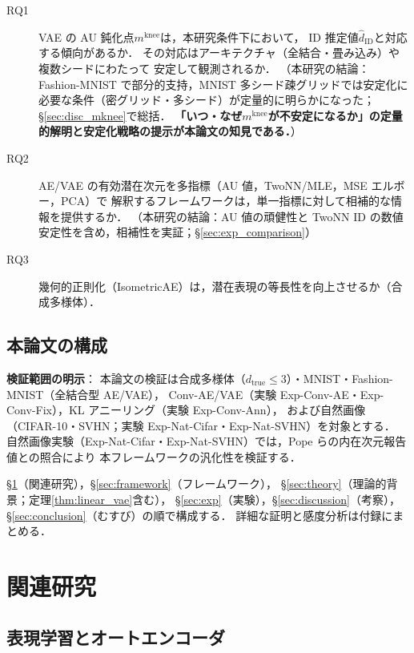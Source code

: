 \documentclass[11pt,a4paper]{jsarticle}
\newcommand{\mknee}{m^{\mathrm{knee}}}
\begin{document}
\begin{description}
  \item[RQ1] VAE の AU 鈍化点$\mknee$は，本研究条件下において，
             ID 推定値$\hat{d}_\mathrm{ID}$と対応する傾向があるか．
             その対応はアーキテクチャ（全結合・畳み込み）や複数シードにわたって
             安定して観測されるか．
             （本研究の結論：Fashion-MNIST で部分的支持，MNIST 多シード疎グリッドでは安定化に必要な条件（密グリッド・多シード）が定量的に明らかになった；
             §\ref{sec:disc_mknee}で総括．
             \textbf{「いつ・なぜ$\mknee$が不安定になるか」の定量的解明と安定化戦略の提示が本論文の知見である．}）
  \item[RQ2] AE/VAE の有効潜在次元を多指標（AU 値，TwoNN/MLE，MSE エルボー，PCA）で
             解釈するフレームワークは，単一指標に対して相補的な情報を提供するか．
             （本研究の結論：AU 値の頑健性と TwoNN ID の数値安定性を含め，相補性を実証；§\ref{sec:exp_comparison}）
  \item[RQ3] 幾何的正則化（IsometricAE）は，潜在表現の等長性を向上させるか（合成多様体）．
\end{description}

\subsection{本論文の構成}\label{sec:intro_structure}

\textbf{検証範囲の明示}：
本論文の検証は合成多様体（$d_{\mathrm{true}} \leq 3$）・MNIST・Fashion-MNIST（全結合型 AE/VAE），
Conv-AE/VAE（実験 Exp-Conv-AE・Exp-Conv-Fix），KL アニーリング（実験 Exp-Conv-Ann），
および自然画像（CIFAR-10・SVHN；実験 Exp-Nat-Cifar・Exp-Nat-SVHN）を対象とする．
自然画像実験（Exp-Nat-Cifar・Exp-Nat-SVHN）では，Pope ら\cite{pope2021intrinsic}の内在次元報告値との照合により
本フレームワークの汎化性を検証する．

§\ref{sec:related}（関連研究），§\ref{sec:framework}（フレームワーク），
§\ref{sec:theory}（理論的背景；定理\ref{thm:linear_vae}含む），
§\ref{sec:exp}（実験），§\ref{sec:discussion}（考察），§\ref{sec:conclusion}（むすび）の順で構成する．
詳細な証明と感度分析は付録にまとめる．

\section{関連研究}\label{sec:related}

\subsection{表現学習とオートエンコーダ}\label{sec:related_ae}
\end{document}
